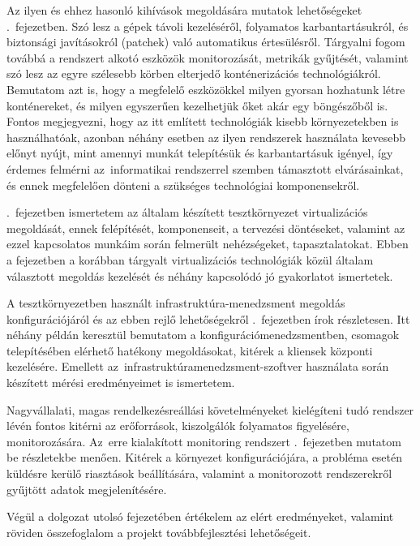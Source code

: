 Az ilyen és ehhez hasonló kihívások megoldására mutatok lehetőségeket  .~fejezetben. Szó lesz a gépek távoli kezeléséről, folyamatos karbantartásukról, és biztonsági javításokról (patchek) való automatikus értesülésről. Tárgyalni fogom továbbá a rendszert alkotó eszközök monitorozását, metrikák gyűjtését, valamint szó lesz az egyre szélesebb körben elterjedő konténerizációs technológiákról. Bemutatom azt is, hogy a megfelelő eszközökkel milyen gyorsan hozhatunk létre konténereket, és milyen egyszerűen kezelhetjük őket akár egy böngészőből is.
Fontos megjegyezni, hogy az itt említett technológiák kisebb környezetekben is használhatóak, azonban néhány esetben az ilyen rendszerek használata kevesebb előnyt nyújt, mint amennyi munkát telepítésük és karbantartásuk igényel, így érdemes felmérni az~informatikai rendszerrel szemben támasztott elvárásainkat, és ennek megfelelően dönteni a szükséges technológiai komponensekről.

.~fejezetben ismertetem az általam készített tesztkörnyezet virtualizációs megoldását, ennek felépítését, komponenseit, a tervezési döntéseket, valamint az ezzel kapcsolatos munkáim során felmerült nehézségeket, tapasztalatokat. Ebben a fejezetben a korábban tárgyalt virtualizációs technológiák közül általam választott megoldás kezelését és néhány kapcsolódó jó gyakorlatot ismertetek.

A tesztkörnyezetben használt infrastruktúra-menedzsment megoldás konfigurációjáról és az ebben rejlő lehetőségekről .~fejezetben írok részletesen. Itt néhány példán keresztül bemutatom a konfigurációmenedzsmentben, csomagok telepítésében elérhető hatékony megoldásokat, kitérek a kliensek központi kezelésére. Emellett az~infrastruktúramenedzsment-szoftver használata során készített mérési eredményeimet is ismertetem.

Nagyvállalati, magas rendelkezésreállási követelményeket kielégíteni tudó rendszer lévén fontos kitérni az erőforrások, kiszolgálók folyamatos figyelésére, monitorozására. Az~erre kialakított monitoring rendszert .~fejezetben mutatom be részletekbe menően. Kitérek a környezet konfigurációjára, a probléma esetén küldésre kerülő riasztások beállítására, valamint a monitorozott rendszerekről gyűjtött adatok megjelenítésére.

Végül a dolgozat utolsó fejezetében értékelem az elért eredményeket, valamint röviden összefoglalom a projekt továbbfejlesztési lehetőségeit.


